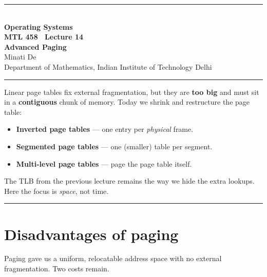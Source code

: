 \documentclass[11pt,a4paper]{article}
\begin{document}
\begin{center}
{\color{rulegray}\rule{\textwidth}{1.1pt}}\\[0.45em]
{\LARGE\bfseries Operating Systems}\\[0.25em]
{\Large\bfseries MTL 458 \textperiodcentered\ Lecture 14}\\[0.35em]
{\LARGE\bfseries Advanced Paging}\\[0.35em]
{\large Minati De}\\[0.15em]
{\normalsize Department of Mathematics, Indian Institute of Technology Delhi}\\[0.35em]
{\color{rulegray}\rule{\textwidth}{1.1pt}}
\end{center}

\vspace{0.4em}
\begin{keybox}
Linear page tables fix external fragmentation, but they are
\textbf{too big} and must sit in a \textbf{contiguous} chunk of memory.
Today we shrink and restructure the page table:
\begin{itemize}
  \item \textbf{Inverted page tables} --- one entry per \emph{physical} frame.
  \item \textbf{Segmented page tables} --- one (smaller) table per segment.
  \item \textbf{Multi-level page tables} --- page the page table itself.
\end{itemize}
The TLB from the previous lecture remains the way we hide the extra
lookups. Here the focus is \emph{space}, not time.
\end{keybox}

\tableofcontents
\vspace{0.6em}
{\color{rulegray}\rule{\textwidth}{0.4pt}}

\section{Disadvantages of paging}

Paging gave us a uniform, relocatable address space with no external
fragmentation. Two costs remain.
\end{document}
